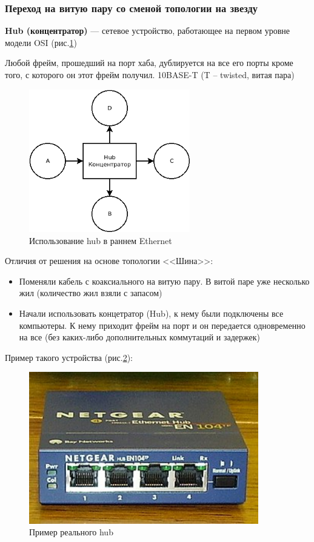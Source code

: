 \documentclass[a4paper]{article}
\begin{document}
\subsubsection{Переход на витую пару со сменой топологии на звезду}
\textbf{Hub (концентратор)} --- сетевое устройство, работающее на первом уровне модели OSI (рис.\ref{fig:pic-15-ethernet-hub})

Любой фрейм, прошедший на порт хаба, дублируется на все его порты кроме того, с которого он этот фрейм получил. 10BASE-T (T -- twisted, витая пара)

\begin{figure}[!h]
	\centering
	\includegraphics[width=7cm]{15-ethernet-hub}
	\caption{Использование hub в раннем Ethernet}
	\label{fig:pic-15-ethernet-hub}
\end{figure}

Отличия от решения на основе топологии <<Шина>>:
\begin{itemize}
	\item Поменяли кабель с коаксиального на витую пару. В витой паре уже несколько жил (количество жил взяли с запасом)
	\item Начали использовать концетратор (Hub), к нему были подключены все компьютеры. К нему приходит фрейм на порт и он передается одновременно на все (без каких-либо дополнительных коммутаций и задержек)
\end{itemize}

Пример такого устройства (рис.\ref{fig:pic-16-ethernet-hub}):
\begin{figure}[!h]
	\centering
	\includegraphics[width=10cm]{16-ethernet-hub}
	\caption{Пример реального hub}
	\label{fig:pic-16-ethernet-hub}
\end{figure}
\end{document}
